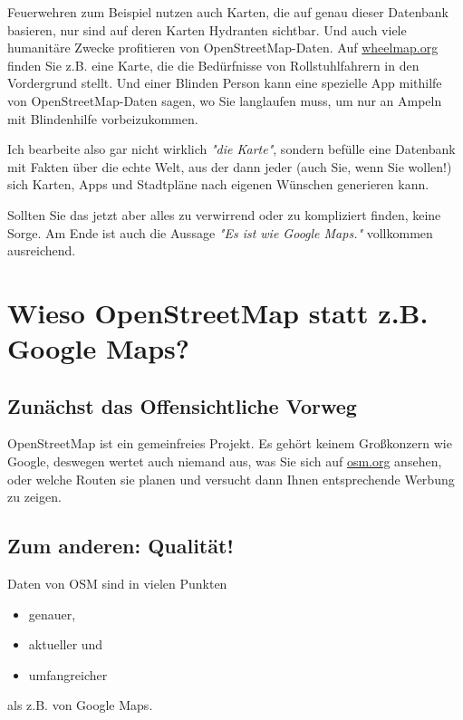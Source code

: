 \documentclass[10pt,foldmark,notumble]{leaflet}
\newcommand{\myhy}[1]{{\color{blue}\setulcolor{blue}\ul{#1}}}
\begin{document}
    Feuerwehren zum Beispiel nutzen auch Karten, die auf genau dieser Datenbank basieren, nur sind auf deren Karten Hydranten sichtbar.
    Und auch viele humanitäre Zwecke profitieren von OpenStreetMap-Daten.
    Auf \myhy{wheelmap.org} finden Sie z.B. eine Karte, die die Bedürfnisse von Rollstuhlfahrern in den Vordergrund stellt.
    Und einer Blinden Person kann eine spezielle App mithilfe von OpenStreetMap-Daten sagen, wo Sie langlaufen muss, um nur an Ampeln mit Blindenhilfe vorbeizukommen.

    Ich bearbeite also gar nicht wirklich \textit{"die Karte"}, sondern befülle eine Datenbank mit Fakten über die echte Welt, aus der dann jeder (auch Sie, wenn Sie wollen!) sich Karten, Apps und Stadtpläne nach eigenen Wünschen generieren kann.

    Sollten Sie das jetzt aber alles zu verwirrend oder zu kompliziert finden, keine Sorge.
    Am Ende ist auch die Aussage \textit{"Es ist wie Google Maps."} vollkommen ausreichend.


    \section{Wieso OpenStreetMap statt z.B. Google Maps?}
    \subsection{Zunächst das Offensichtliche Vorweg}
    OpenStreetMap ist ein gemeinfreies Projekt.
    Es gehört keinem Großkonzern wie Google, deswegen wertet auch niemand aus, was Sie sich auf \myhy{osm.org} ansehen, oder welche Routen sie planen und versucht dann Ihnen entsprechende Werbung zu zeigen.

    \subsection{Zum anderen: Qualität!}
    Daten von OSM sind in vielen Punkten
    \begin{itemize}[noitemsep,topsep=0pt]
        \item genauer,
        \item aktueller und
        \item umfangreicher
    \end{itemize}
    als z.B. von Google Maps.
\end{document}
